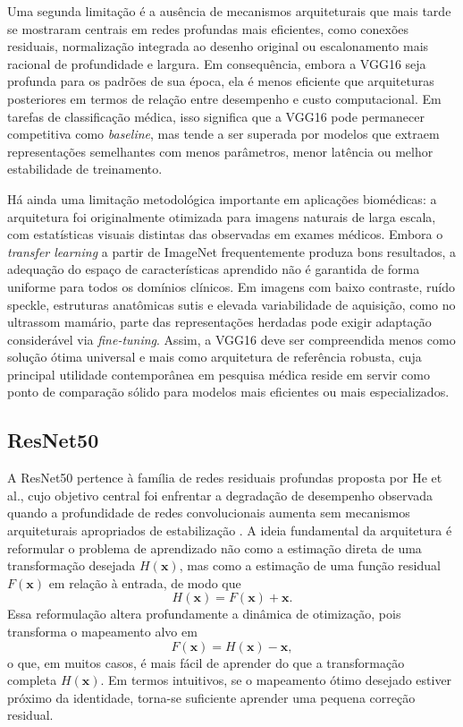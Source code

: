 \documentclass[tcc,capa]{texufpel}
\begin{document}
Uma segunda limitação é a ausência de mecanismos arquiteturais que mais tarde se mostraram centrais em redes profundas mais eficientes, como conexões residuais, normalização integrada ao desenho original ou escalonamento mais racional de profundidade e largura. Em consequência, embora a VGG16 seja profunda para os padrões de sua época, ela é menos eficiente que arquiteturas posteriores em termos de relação entre desempenho e custo computacional. Em tarefas de classificação médica, isso significa que a VGG16 pode permanecer competitiva como \textit{baseline}, mas tende a ser superada por modelos que extraem representações semelhantes com menos parâmetros, menor latência ou melhor estabilidade de treinamento. 

Há ainda uma limitação metodológica importante em aplicações biomédicas: a arquitetura foi originalmente otimizada para imagens naturais de larga escala, com estatísticas visuais distintas das observadas em exames médicos. Embora o \textit{transfer learning} a partir de ImageNet frequentemente produza bons resultados, a adequação do espaço de características aprendido não é garantida de forma uniforme para todos os domínios clínicos. Em imagens com baixo contraste, ruído speckle, estruturas anatômicas sutis e elevada variabilidade de aquisição, como no ultrassom mamário, parte das representações herdadas pode exigir adaptação considerável via \textit{fine-tuning}. Assim, a VGG16 deve ser compreendida menos como solução ótima universal e mais como arquitetura de referência robusta, cuja principal utilidade contemporânea em pesquisa médica reside em servir como ponto de comparação sólido para modelos mais eficientes ou mais especializados. 

\subsection{ResNet50}

A ResNet50 pertence à família de redes residuais profundas proposta por He et al., cujo objetivo central foi enfrentar a degradação de desempenho observada quando a profundidade de redes convolucionais aumenta sem mecanismos arquiteturais apropriados de estabilização \cite{He2016}. A ideia fundamental da arquitetura é reformular o problema de aprendizado não como a estimação direta de uma transformação desejada \(H(\mathbf{x})\), mas como a estimação de uma função residual \(F(\mathbf{x})\) em relação à entrada, de modo que
\begin{equation}
	H(\mathbf{x}) = F(\mathbf{x}) + \mathbf{x}.
\end{equation}
Essa reformulação altera profundamente a dinâmica de otimização, pois transforma o mapeamento alvo em
\begin{equation}
	F(\mathbf{x}) = H(\mathbf{x}) - \mathbf{x},
\end{equation}
o que, em muitos casos, é mais fácil de aprender do que a transformação completa \(H(\mathbf{x})\). Em termos intuitivos, se o mapeamento ótimo desejado estiver próximo da identidade, torna-se suficiente aprender uma pequena correção residual.
\end{document}
